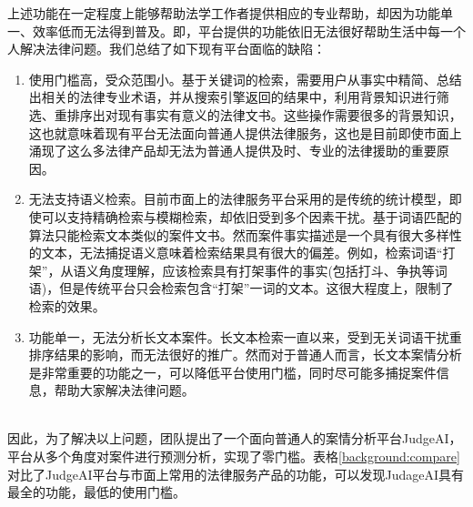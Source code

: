 上述功能在一定程度上能够帮助法学工作者提供相应的专业帮助，却因为功能单一、效率低而无法得到普及。即，平台提供的功能依旧无法很好帮助生活中每一个人解决法律问题。我们总结了如下现有平台面临的缺陷：
\begin{enumerate}[1)]
	\item 使用门槛高，受众范围小。基于关键词的检索，需要用户从事实中精简、总结出相关的法律专业术语，并从搜索引擎返回的结果中，利用背景知识进行筛选、重排序出对现有事实有意义的法律文书。这些操作需要很多的背景知识，这也就意味着现有平台无法面向普通人提供法律服务，这也是目前即使市面上涌现了这么多法律产品却无法为普通人提供及时、专业的法律援助的重要原因。
	\item 无法支持语义检索。目前市面上的法律服务平台采用的是传统的统计模型，即使可以支持精确检索与模糊检索，却依旧受到多个因素干扰。基于词语匹配的算法只能检索文本类似的案件文书。然而案件事实描述是一个具有很大多样性的文本，无法捕捉语义意味着检索结果具有很大的偏差。例如，检索词语“打架”，从语义角度理解，应该检索具有打架事件的事实(包括打斗、争执等词语)，但是传统平台只会检索包含“打架”一词的文本。这很大程度上，限制了检索的效果。
	\item 功能单一，无法分析长文本案件。长文本检索一直以来，受到无关词语干扰重排序结果的影响，而无法很好的推广。然而对于普通人而言，长文本案情分析是非常重要的功能之一，可以降低平台使用门槛，同时尽可能多捕捉案件信息，帮助大家解决法律问题。
\end{enumerate}
~\\
因此，为了解决以上问题，团队提出了一个面向普通人的案情分析平台JudgeAI，平台从多个角度对案件进行预测分析，实现了零门槛。表格\ref{background:compare}对比了JudgeAI平台与市面上常用的法律服务产品的功能，可以发现JudageAI具有最全的功能，最低的使用门槛。



